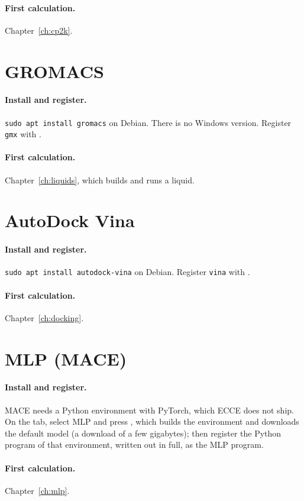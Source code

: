 \paragraph{First calculation.} Chapter~\ref{ch:cp2k}.

\section{GROMACS}
\label{sec:run-gromacs}
\paragraph{Install and register.} \texttt{sudo apt install gromacs} on Debian. There is no Windows version. Register \texttt{gmx} with .

\paragraph{First calculation.} Chapter~\ref{ch:liquids}, which builds and runs a liquid.

\section{AutoDock Vina}
\label{sec:run-vina}
\paragraph{Install and register.} \texttt{sudo apt install autodock-vina} on Debian. Register \texttt{vina} with .

\paragraph{First calculation.} Chapter~\ref{ch:docking}.

\section{MLP (MACE)}
\label{sec:run-mlp}
\paragraph{Install and register.} MACE needs a Python environment with PyTorch, which ECCE does not ship. On the  tab, select MLP and press , which builds the environment and downloads the default model (a download of a few gigabytes); then register the Python program of that environment, written out in full, as the MLP program.

\paragraph{First calculation.} Chapter~\ref{ch:mlp}.

